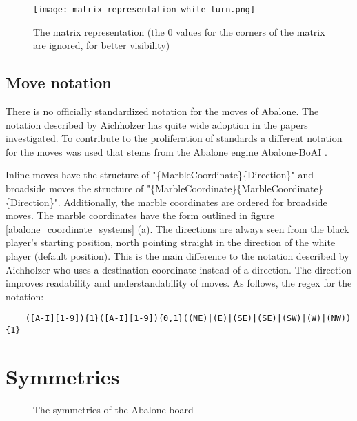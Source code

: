 \begin{figure}[!h]
    \centering
    \texttt{[image: matrix\_representation\_white\_turn.png]}
    \caption{The matrix representation (the $0$ values for the corners of the matrix are ignored, for better visibility)}
    \label{abalone_matrix_representation}
\end{figure}

\subsection{Move notation}
There is no officially standardized notation for the moves of Abalone. The notation described by Aichholzer \cite{aichholzer_abalone_2006} has quite wide adoption in the papers investigated. To contribute to the proliferation of standards \cite{xkcd_standards_nodate} a different notation for the moves was used that stems from the Abalone engine Abalone-BoAI \cite{scriptim_scriptimabalone-boai_2021}.

Inline moves have the structure of "\{MarbleCoordinate\}\{Direction\}" and broadside moves the structure of "\{MarbleCoordinate\}\{MarbleCoordinate\}\{Direction\}". Additionally, the marble coordinates are ordered for broadside moves. The marble coordinates have the form outlined in figure \ref{abalone_coordinate_systems} (a). The directions are always seen from the black player's starting position, north pointing straight in the direction of the white player (default position). This is the main difference to the notation described by Aichholzer who uses a destination coordinate instead of a direction. The direction improves readability and understandability of moves. As follows, the regex for the notation:

\begin{BVerbatim}
    ([A-I][1-9]){1}([A-I][1-9]){0,1}((NE)|(E)|(SE)|(SE)|(SW)|(W)|(NW)){1}
\end{BVerbatim}

\section{Symmetries}
\label{abalone_symmetries}

\begin{figure}
    \centering
    \caption{The symmetries of the Abalone board}
    \label{abalone_symmetries_figure}
\end{figure}

